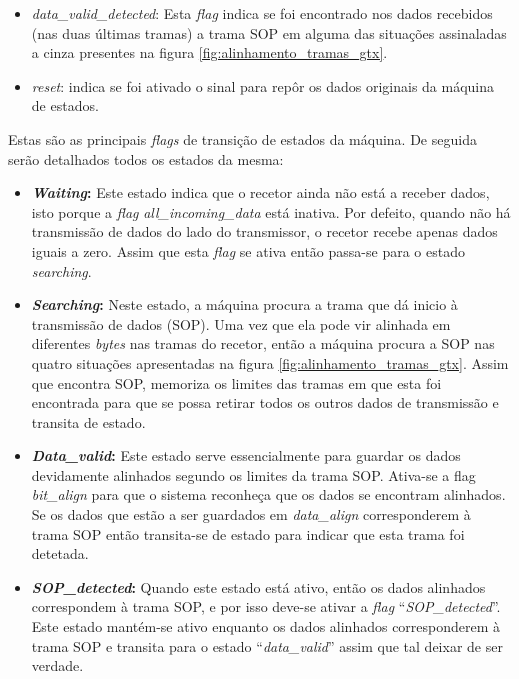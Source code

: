 \documentclass[11pt,a4paper]{article}
\begin{document}
\begin{enumerate}
\begin{itemize}
			\item \textit{data\_valid\_detected}: Esta \textit{flag} indica se foi encontrado nos dados recebidos (nas duas últimas tramas) a trama SOP em alguma das situações assinaladas a cinza presentes na figura \ref{fig:alinhamento_tramas_gtx}.
			
			\item \textit{reset}: indica se foi ativado o sinal para repôr os dados originais da máquina de estados.
		\end{itemize}	 
		
		Estas são as principais \textit{flags} de transição de estados da máquina. De seguida serão detalhados todos os estados da mesma:
		
		\begin{itemize}
			\item \textbf{\textit{Waiting}:} Este estado indica que o recetor ainda não está a receber dados, isto porque a \textit{flag} \textit{all\_incoming\_data} está inativa. Por defeito, quando não há transmissão de dados do lado do transmissor, o recetor recebe apenas dados iguais a zero. Assim que esta \textit{flag} se ativa então passa-se para o estado \textit{searching}.
			
			\item \textbf{\textit{Searching}:} Neste estado, a máquina procura a trama que dá inicio à transmissão de dados (SOP). Uma vez que ela pode vir alinhada em diferentes \textit{bytes} nas tramas do recetor, então a máquina procura a SOP nas quatro situações apresentadas na figura \ref{fig:alinhamento_tramas_gtx}. Assim que encontra SOP, memoriza os limites das tramas em que esta foi encontrada para que se possa retirar todos os outros dados de transmissão e transita de estado.
			
			\item \textbf{\textit{Data\_valid}:} Este estado serve essencialmente para guardar os dados devidamente alinhados segundo os limites da trama SOP. Ativa-se a flag \textit{bit\_align} para que o sistema reconheça que os dados se encontram alinhados. Se os dados que estão a ser guardados em \textit{data\_align} corresponderem à trama SOP então transita-se de estado para indicar que esta trama foi detetada. 
			
			\item \textbf{\textit{SOP\_detected}:} Quando este estado está ativo, então os dados alinhados correspondem à trama SOP, e por isso deve-se ativar a \textit{flag} ``\textit{SOP\_detected}''. Este estado mantém-se ativo enquanto os dados alinhados corresponderem à trama SOP e transita para o estado ``\textit{data\_valid}'' assim que tal deixar de ser verdade. 
		\end{itemize}
		

\end{enumerate}
\end{document}
